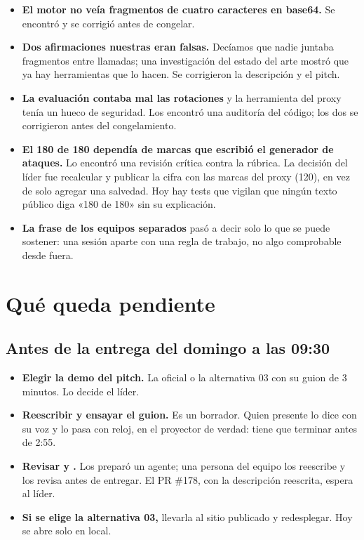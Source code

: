 \begin{itemize}
  \item \textbf{El motor no veía fragmentos de cuatro caracteres en base64.} Se encontró y se
    corrigió antes de congelar.
  \item \textbf{Dos afirmaciones nuestras eran falsas.} Decíamos que nadie juntaba fragmentos entre
    llamadas; una investigación del estado del arte mostró que ya hay herramientas que lo hacen. Se
    corrigieron la descripción y el pitch.
  \item \textbf{La evaluación contaba mal las rotaciones} y la herramienta  del proxy tenía
    un hueco de seguridad. Los encontró una auditoría del código; los dos se corrigieron antes del
    congelamiento.
  \item \textbf{El 180 de 180 dependía de marcas que escribió el generador de ataques.} Lo encontró
    una revisión crítica contra la rúbrica. La decisión del líder fue recalcular y publicar la cifra
    con las marcas del proxy (120), en vez de solo agregar una salvedad. Hoy hay tests que vigilan que
    ningún texto público diga «180 de 180» sin su explicación.
  \item \textbf{La frase de los equipos separados} pasó a decir solo lo que se puede sostener: una
    sesión aparte con una regla de trabajo, no algo comprobable desde fuera.
\end{itemize}

\section{Qué queda pendiente}\label{sec:pendiente}

\subsection{Antes de la entrega del domingo a las 09:30}

\begin{itemize}
  \item \textbf{Elegir la demo del pitch.} La oficial o la alternativa 03 con su guion de 3 minutos.
    Lo decide el líder.
  \item \textbf{Reescribir y ensayar el guion.} Es un borrador. Quien presente lo dice con su voz y lo
    pasa con reloj, en el proyector de verdad: tiene que terminar antes de 2:55.
  \item \textbf{Revisar  y .} Los preparó un agente; una
    persona del equipo los reescribe y los revisa antes de entregar. El PR \#178, con la descripción
    reescrita, espera al líder.
  \item \textbf{Si se elige la alternativa 03,} llevarla al sitio publicado y redesplegar. Hoy se abre
    solo en local.
\end{itemize}

